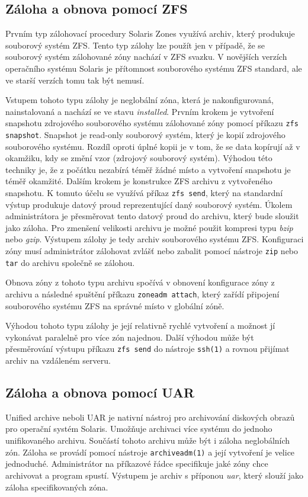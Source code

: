 \subsection{Záloha a obnova pomocí ZFS}
\label{chapter:zones:backup:zfs}
Prvním typ zálohovací procedury Solaris Zones využívá archiv, který produkuje souborový systém ZFS. Tento typ zálohy lze použít
jen v případě, že se souborový systém zálohované zóny nachází v ZFS svazku. V novějších verzích operačního systému Solaris je 
přítomnost souborového systému ZFS standard, ale ve starší verzích tomu tak být nemusí.

Vstupem tohoto typu zálohy je neglobální zóna, která je nakonfigurovaná, nainstalovaná a nachází se ve stavu \textit{installed}.
Prvním krokem je vytvoření snapshotu zdrojového souborového systému zálohované zóny pomocí příkazu \verb|zfs snapshot|. Snapshot
je read-only souborový systém, který je kopií zdrojového souborového systému. Rozdíl oproti úplné kopii je v tom, že se data 
kopírují až v okamžiku, kdy se změní vzor (zdrojový souborový systém). Výhodou této techniky je, že z počátku nezabírá téměř žádné místo a
vytvoření snapshotu je téměř okamžité. Dalším krokem je konstrukce ZFS archivu z vytvořeného snapshotu. K tomuto účelu se využívá příkaz 
\verb|zfs send|, který na standardní výstup produkuje datový proud reprezentující daný souborový systém. Úkolem administrátora je
přesměrovat tento datový proud do archivu, který bude sloužit jako záloha. Pro zmenšení velikosti archivu je možné použit kompresi 
typu \textit{bzip} nebo \textit{gzip}. Výstupem zálohy je tedy archiv souborového systému ZFS. Konfiguraci zóny musí administrátor 
zálohovat zvlášť nebo zabalit pomocí nástroje \verb|zip| nebo \verb|tar| do archivu společně se zálohou.

Obnova zóny z tohoto typu archivu spočívá v obnovení konfigurace zóny z archivu  a následné spuštění příkazu \verb|zoneadm attach|,
který zařídí připojení souborového systému ZFS na správné místo v globální zóně.

Výhodou tohoto typu zálohy je její relativně rychlé vytvoření a možnost jí vykonávat paralelně pro více zón najednou. Další výhodou
může být přesměrování výstupu příkazu \verb|zfs send| do nástroje \verb|ssh(1)| a rovnou přijímat archiv na vzdáleném serveru.
\subsection{Záloha a obnova pomocí UAR}
\label{chapter:zones:backup:uar}
Unified archive neboli UAR \cite{oracle:solaris:zones:uar} je nativní nástroj pro archivování diskových obrazů pro operační systém
Solaris. Umožňuje archivaci více systému do jednoho unifikovaného archivu. Součástí tohoto archivu může být i záloha neglobálních
zón. Záloha se provádí pomocí nástroje \verb|archiveadm(1)| a její vytvoření je velice jednoduché. Administrátor na příkazové
řádce specifikuje jaké zóny chce archivovat a program spustí. Výstupem je archiv s příponou \textit{uar}, který slouží jako záloha
specifikovaných zóna.

